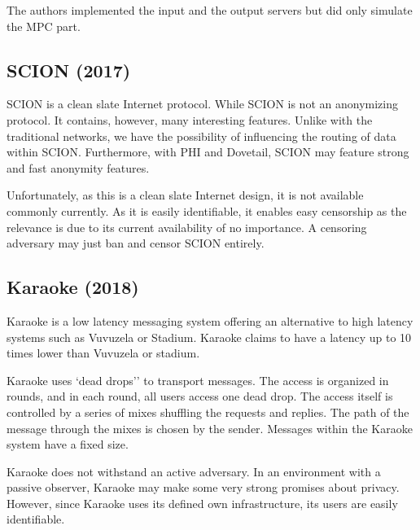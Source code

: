 The authors implemented the input and the output servers but did only simulate the MPC part.

%

%
%

\subsection{SCION (2017)}
SCION\cite{perrig2017scion} is a clean slate Internet protocol. While SCION is not an anonymizing protocol. It contains, however,  many interesting features. Unlike with the traditional networks, we have the possibility of influencing the routing of data within SCION. Furthermore, with PHI\cite{chen2017phi} and Dovetail\cite{sankey2014dovetail}, SCION may feature strong and fast anonymity features. 

Unfortunately, as this is a clean slate Internet design, it is not available commonly currently. As it is easily identifiable, it enables easy censorship as the relevance is due to its current availability of no importance. A censoring adversary may just ban and censor SCION entirely. 

\subsection{Karaoke (2018)}
Karaoke\cite{lazar2018karaoke} is a low latency messaging system offering an alternative to high latency systems such as Vuvuzela or Stadium. Karaoke claims to have a latency up to 10 times lower than Vuvuzela or stadium. 

Karaoke uses `dead drops'' to transport messages. The access is organized in rounds, and in each round, all users access one dead drop. The access itself is controlled by a series of mixes shuffling the requests and replies. The path of the message through the mixes is chosen by the sender. Messages within the Karaoke system have a fixed size.

Karaoke does not withstand an active adversary. In an environment with a passive observer, Karaoke may make some very strong promises about privacy. However, since Karaoke uses its defined own infrastructure, its users are easily identifiable.

